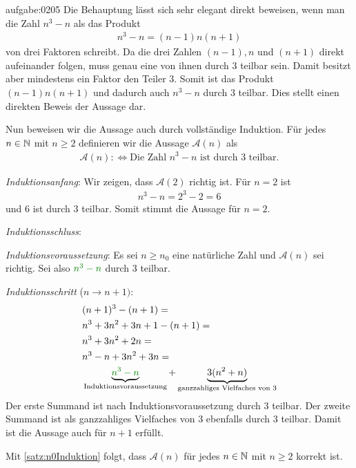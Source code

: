 \begin{antwort}{aufgabe:0205}
Die Behauptung lässt sich sehr elegant direkt beweisen, wenn man die Zahl $n^3-n$ als das Produkt
\begin{align*}
    n^3-n = (n-1)n(n+1)
\end{align*}
von drei Faktoren schreibt. Da die drei Zahlen $(n-1), n$ und $(n+1)$ direkt aufeinander folgen, muss genau eine von ihnen durch $3$ teilbar sein. Damit besitzt aber mindestens ein Faktor den Teiler $3$. Somit ist das Produkt $(n-1)n(n+1)$ und dadurch auch $n^3-n$ durch $3$ teilbar. Dies stellt einen direkten Beweis der Aussage dar.

Nun beweisen wir die Aussage auch durch vollständige Induktion. Für jedes $n\in\mathbb{N}$ mit $n\geq 2$ definieren wir die Aussage $\mathcal{A}(n)$ als
\begin{align*}
    \mathcal{A}(n) :\iff \text{Die Zahl } n^3-n \text{ ist durch $3$ teilbar}.
\end{align*}
\begin{aenum}
    \item \textit{Induktionsanfang}: Wir zeigen, dass $\mathcal{A}(2)$ richtig ist. Für $n=2$ ist
    \begin{align*}
        n^3-n = 2^3-2 = 6
    \end{align*}
    und $6$ ist durch $3$ teilbar. Somit stimmt die Aussage für $n=2$.
    \item \textit{Induktionsschluss}:
        \begin{renum}
            \item \textit{Induktionsvoraussetzung}: Es sei $n\geq n_0$ eine natürliche Zahl und $\mathcal{A}(n)$ sei richtig. Sei also $\textcolor{Green}{n^3-n}$ durch $3$ teilbar.
            \item \textit{Induktionsschritt} ($n\to n+1)$:
            \begin{align*}
                & (n+1)^3-(n+1) = \\
                & n^3+3n^2+3n+1 - (n+1) = \\
                & n^3+3n^2+2n = \\
                & n^3-n+3n^2+3n = \\
                & \underbrace{\textcolor{Green}{n^3-n}}_{\text{Induktionsvoraussetzung}}+\underbrace{3(n^2+n)}_{\text{ganzzahliges Vielfaches von $3$}}
            \end{align*}
        Der erste Summand ist nach Induktionsvoraussetzung durch $3$ teilbar. Der zweite Summand ist als ganzzahliges Vielfaches von $3$ ebenfalls durch $3$ teilbar. Damit ist die Aussage auch für $n+1$ erfüllt.
        \end{renum}
\end{aenum}
Mit \cref{satz:n0Induktion} folgt, dass $\mathcal{A}(n)$ für jedes $n\in\mathbb{N}$ mit $n\geq 2$ korrekt ist.
\end{antwort}


